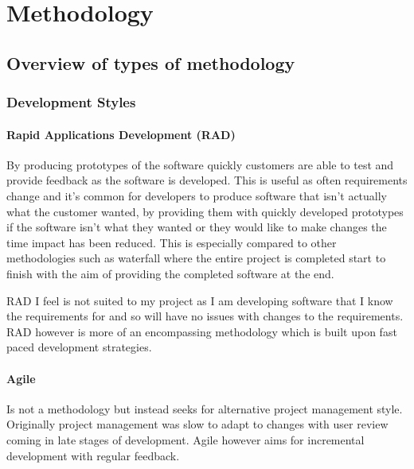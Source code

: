 \section{Methodology}\label{methodology}

\subsection{Overview of types of
methodology}\label{overview-of-types-of-methodology}

\subsubsection{Development Styles}\label{development-styles}

\paragraph{Rapid Applications Development
(RAD)}\label{rapid-applications-development-rad}

By producing prototypes of the software quickly customers are able to
test and provide feedback as the software is developed. This is useful
as often requirements change and it's common for developers to produce
software that isn't actually what the customer wanted, by providing them
with quickly developed prototypes if the software isn't what they wanted
or they would like to make changes the time impact has been reduced.
This is especially compared to other methodologies such as waterfall
where the entire project is completed start to finish with the aim of
providing the completed software at the end.

RAD I feel is not suited to my project as I am developing software that
I know the requirements for and so will have no issues with changes to
the requirements. RAD however is more of an encompassing methodology
which is built upon fast paced development strategies.

\paragraph{Agile}\label{agile}

Is not a methodology but instead seeks for alternative project
management style. Originally project management was slow to adapt to
changes with user review coming in late stages of development. Agile
however aims for incremental development with regular feedback.
\parencite{agile}


